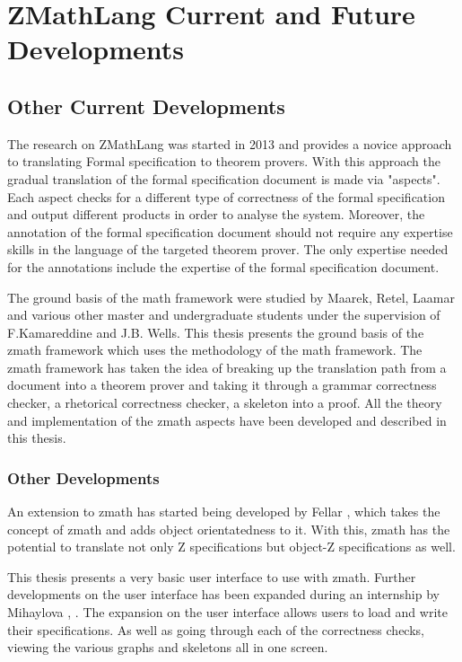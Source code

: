 \section{ZMathLang Current and Future Developments}
\label{sec:zmathcurandfut}

\subsection{Other Current Developments}
\label{subsec:currendevelopments}

The research on ZMathLang was started in 2013 and provides a novice approach to
translating Formal specification to theorem provers. With this approach the
gradual translation of the formal specification document is made via "aspects".
Each aspect checks for a different type of correctness of the formal
specification and output different products in order to analyse the system.
Moreover, the annotation of the formal specification document should not require
any expertise skills in the language of the targeted theorem prover. The only
expertise needed for the annotations include the expertise of the formal
specification document.

The ground basis of the \gls{math} framework were studied by Maarek, Retel,
Laamar and various other master and undergraduate students under the supervision
of F.Kamareddine and J.B. Wells. This thesis presents the ground basis of the
\gls{zmath} framework which uses the methodology of the \gls{math} framework.
The \gls{zmath} framework has taken the idea of breaking up the translation path
from a document into a theorem prover and taking it through a grammar
correctness checker, a rhetorical correctness checker, a skeleton into a proof.
All the theory and implementation of the \gls{zmath} aspects have been developed
and described in this thesis.

\subsubsection{Other Developments}

An extension to \gls{zmath} has started being developed by Fellar
\cite{zmathmaster}, \cite{ozmathconference} which takes the concept of
\gls{zmath} and adds object orientatedness to it. With this, \gls{zmath} has the
potential to translate not only Z specifications but object-Z specifications as
well. 

This thesis presents a very basic user interface to use with \gls{zmath}.
Further developments on the user interface has been expanded during an
internship by Mihaylova \cite{zmathuser}, \cite{zmathinternship}. The expansion
on the user interface allows users to load and write their specifications. As
well as going through each of the correctness checks, viewing the various graphs
and skeletons all in one screen.

